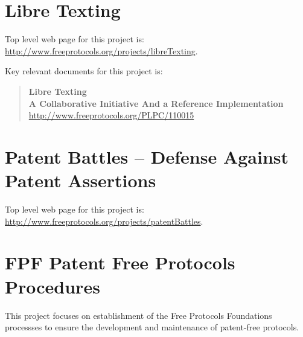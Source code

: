 \section{Libre Texting}

Top level web page for this project is: \href{http://www.freeprotocols.org/projects/libreTexting}{http://www.freeprotocols.org/projects/libreTexting}.

Key relevant documents for this project is:

\begin{quote}
  \textbf{Libre Texting}\\
  \textbf{A Collaborative Initiative And a Reference Implementation}\\
  \href{http://www.freeprotocols.org/PLPC/110015}{http://www.freeprotocols.org/PLPC/110015}
\end{quote}

\section{Patent Battles -- Defense Against Patent Assertions}

Top level web page for this project is: \href{http://www.freeprotocols.org/projects/patentBattles}{http://www.freeprotocols.org/projects/patentBattles}.






\section{FPF Patent Free Protocols Procedures}

This project focuses on establishment of the Free Protocols Foundations
processses to ensure the development and maintenance of patent-free protocols.

